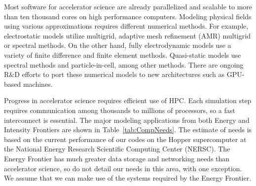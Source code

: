 Most software for accelerator science are already parallelized and scalable to 
more than ten thousand cores on high performance computers. 
Modeling physical fields using various approximations requires different 
numerical methods.  For example, electrostatic models utilize multigrid, 
adaptive mesh refinement (AMR) multigrid or spectral methods.
On the other hand, fully electrodynamic models use a variety of
finite difference and finite element methods.
Quasi-static models use spectral methods and particle-in-cell, among
other methods.
There are ongoing R\&D efforts to port these numerical models to new architectures such as GPU-based machines.

Progress in accelerator science requires efficient use of HPC.
Each simulation step requires communication among thousands to
millions of processors, so a fast interconnect is essential.
The major modeling applications from both Energy and Intensity
Frontiers are shown in Table~\ref{tab:CompNeeds}.  The estimate of needs is
based on the current performance of our codes on the Hopper supercomputer at
the National Energy Research Scientific Computing Center (NERSC). 
The Energy Frontier has much greater data storage and networking needs
than accelerator science, so do not detail our needs in this area, with one
exception.  We assume that we can make use of the systems required by
the Energy Frontier.

